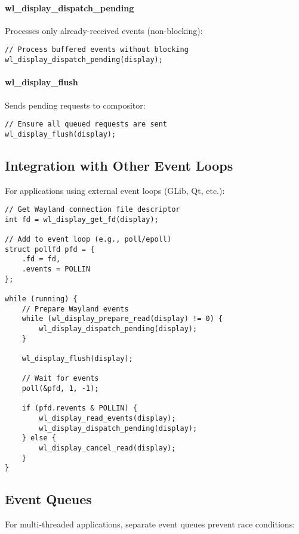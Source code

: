 \paragraph{wl\_display\_dispatch\_pending}
Processes only already-received events (non-blocking):
\begin{lstlisting}[style=cstyle]
// Process buffered events without blocking
wl_display_dispatch_pending(display);
\end{lstlisting}

\paragraph{wl\_display\_flush}
Sends pending requests to compositor:
\begin{lstlisting}[style=cstyle]
// Ensure all queued requests are sent
wl_display_flush(display);
\end{lstlisting}

\subsection{Integration with Other Event Loops}

For applications using external event loops (GLib, Qt, etc.):

\begin{lstlisting}[style=cstyle, caption=File Descriptor Integration]
// Get Wayland connection file descriptor
int fd = wl_display_get_fd(display);

// Add to event loop (e.g., poll/epoll)
struct pollfd pfd = {
    .fd = fd,
    .events = POLLIN
};

while (running) {
    // Prepare Wayland events
    while (wl_display_prepare_read(display) != 0) {
        wl_display_dispatch_pending(display);
    }

    wl_display_flush(display);

    // Wait for events
    poll(&pfd, 1, -1);

    if (pfd.revents & POLLIN) {
        wl_display_read_events(display);
        wl_display_dispatch_pending(display);
    } else {
        wl_display_cancel_read(display);
    }
}
\end{lstlisting}

\subsection{Event Queues}

For multi-threaded applications, separate event queues prevent race conditions:

